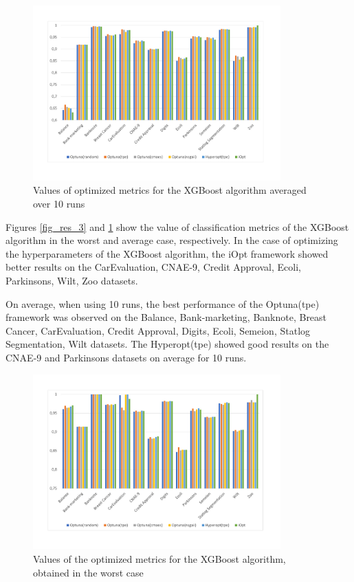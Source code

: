 \documentclass[preprint,12pt]{elsarticle}
\begin{document}
\begin{figure}
\centering
\includegraphics[width=0.85\textwidth]{XGBoost_2_avg.pdf}
\caption{Values of optimized metrics for the XGBoost algorithm averaged over 10 runs} \label{fig_res_4}
\end{figure}

Figures \ref{fig_res_3} and \ref{fig_res_4} show the value of classification metrics of the XGBoost algorithm in the worst and average case, respectively. In the case of optimizing the hyperparameters  of the XGBoost algorithm, the iOpt framework showed better results on the CarEvaluation, CNAE-9, Credit Approval, Ecoli, Parkinsons, Wilt, Zoo datasets.

On average, when using 10 runs, the best performance of the Optuna(tpe) framework was observed on the Balance, Bank-marketing, Banknote, Breast Cancer, CarEvaluation, Credit Approval, Digits, Ecoli, Semeion, Statlog Segmentation, Wilt datasets. The Hyperopt(tpe) showed good results on the CNAE-9 and Parkinsons datasets on average for 10 runs.

\begin{figure}
\centering
\includegraphics[width=0.85\textwidth]{MLP_1.pdf}
\caption{Values of the optimized metrics for the XGBoost algorithm, obtained in the worst case} \label{fig_res_5}
\end{figure}
\end{document}
